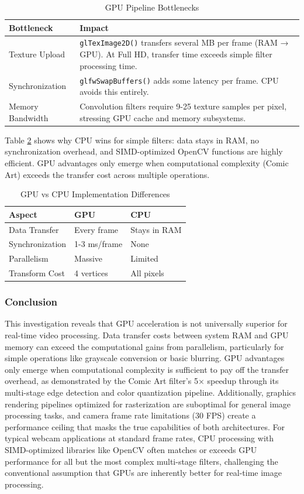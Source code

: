 \documentclass[12pt,a4paper]{article}
\begin{document}
\begin{table}[H]
\centering
\caption{GPU Pipeline Bottlenecks}
\label{tab:gpu_bottlenecks}
\begin{tabular}{lp{7cm}}
\toprule
\textbf{Bottleneck} & \textbf{Impact} \\
\midrule
Texture Upload & \texttt{glTexImage2D()} transfers several MB per frame (RAM → GPU). At Full HD, transfer time exceeds simple filter processing time. \\
Synchronization & \texttt{glfwSwapBuffers()} adds some latency per frame. CPU avoids this entirely. \\
Memory Bandwidth & Convolution filters require 9-25 texture samples per pixel, stressing GPU cache and memory subsystems. \\
\bottomrule
\end{tabular}
\end{table}
Table \ref{tab:shader_cpu_comparison} shows why CPU wins for simple filters: data stays in RAM, no synchronization overhead, and SIMD-optimized OpenCV functions are highly efficient. GPU advantages only emerge when computational complexity (Comic Art) exceeds the transfer cost across multiple operations.
\begin{table}[H]
\centering
\caption{GPU vs CPU Implementation Differences}
\label{tab:shader_cpu_comparison}
\begin{tabular}{lll}
\toprule
\textbf{Aspect} & \textbf{GPU} & \textbf{CPU} \\
\midrule
Data Transfer & Every frame & Stays in RAM \\
Synchronization & 1-3 ms/frame & None \\
Parallelism & Massive & Limited \\
Transform Cost & 4 vertices & All pixels \\
\bottomrule
\end{tabular}
\end{table}

\subsubsection{Conclusion}
This investigation reveals that GPU acceleration is not universally superior for real-time video processing. Data transfer costs between system RAM and GPU memory can exceed the computational gains from parallelism, particularly for simple operations like grayscale conversion or basic blurring. GPU advantages only emerge when computational complexity is sufficient to pay off the transfer overhead, as demonstrated by the Comic Art filter's 5× speedup through its multi-stage edge detection and color quantization pipeline. Additionally, graphics rendering pipelines optimized for rasterization are suboptimal for general image processing tasks, and camera frame rate limitations (30 FPS) create a performance ceiling that masks the true capabilities of both architectures. For typical webcam applications at standard frame rates, CPU processing with SIMD-optimized libraries like OpenCV often matches or exceeds GPU performance for all but the most complex multi-stage filters, challenging the conventional assumption that GPUs are inherently better for real-time image processing.
\end{document}
